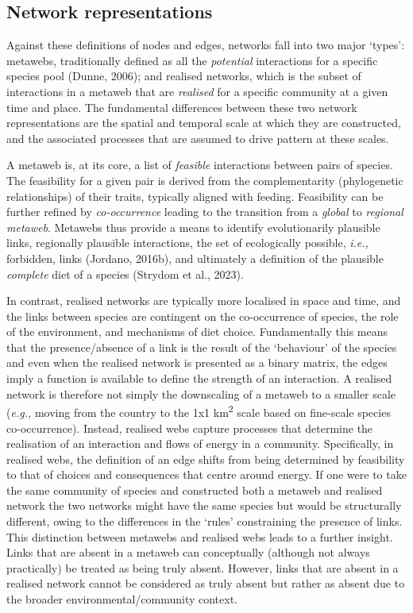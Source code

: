 \documentclass[
]{article}
\begin{document}
\subsection{Network representations}\label{sec-representation}

Against these definitions of nodes and edges, networks fall into two
major `types': metawebs, traditionally defined as all the
\emph{potential} interactions for a specific species pool (Dunne, 2006);
and realised networks, which is the subset of interactions in a metaweb
that are \emph{realised} for a specific community at a given time and
place. The fundamental differences between these two network
representations are the spatial and temporal scale at which they are
constructed, and the associated processes that are assumed to drive
pattern at these scales.

A metaweb is, at its core, a list of \emph{feasible} interactions
between pairs of species. The feasibility for a given pair is derived
from the complementarity (phylogenetic relationships) of their traits,
typically aligned with feeding. Feasibility can be further refined by
\emph{co-occurrence} leading to the transition from a \emph{global} to
\emph{regional metaweb}. Metawebs thus provide a means to identify
evolutionarily plausible links, regionally plausible interactions, the
set of ecologically possible, \emph{i.e.,} forbidden, links (Jordano,
2016b), and ultimately a definition of the plausible \emph{complete}
diet of a species (Strydom et al., 2023).

In contrast, realised networks are typically more localised in space and
time, and the links between species are contingent on the co-occurrence
of species, the role of the environment, and mechanisms of diet choice.
Fundamentally this means that the presence/absence of a link is the
result of the `behaviour' of the species and even when the realised
network is presented as a binary matrix, the edges imply a function is
available to define the strength of an interaction. A realised network
is therefore not simply the downscaling of a metaweb to a smaller scale
(\emph{e.g.,} moving from the country to the 1x1 km\textsuperscript{2}
scale based on fine-scale species co-occurrence). Instead, realised webs
capture processes that determine the realisation of an interaction and
flows of energy in a community. Specifically, in realised webs, the
definition of an edge shifts from being determined by feasibility to
that of choices and consequences that centre around energy. If one were
to take the same community of species and constructed both a metaweb and
realised network the two networks might have the same species but would
be structurally different, owing to the differences in the `rules'
constraining the presence of links. This distinction between metawebs
and realised webs leads to a further insight. Links that are absent in a
metaweb can conceptually (although not always practically) be treated as
being truly absent. However, links that are absent in a realised network
cannot be considered as truly absent but rather as absent due to the
broader environmental/community context.
\end{document}
